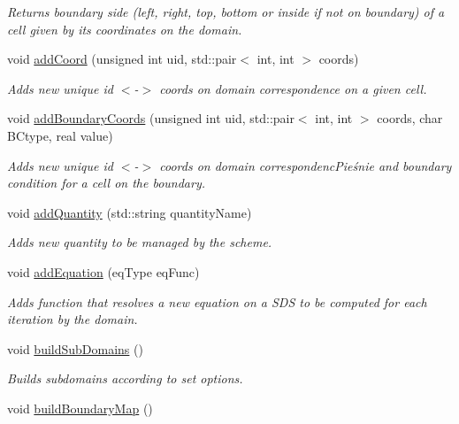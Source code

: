 \begin{DoxyCompactItemize}
\begin{DoxyCompactList}\small\item\em Returns boundary side (left, right, top, bottom or inside if not on boundary) of a cell given by its coordinates on the domain. \item\end{DoxyCompactList}\item 
void \hyperlink{classDomain_a1463e043dbcda6e6755dda83c26d6b73}{addCoord} (unsigned int uid, std::pair$<$ int, int $>$ coords)
\begin{DoxyCompactList}\small\item\em Adds new unique id $<$-\/$>$ coords on domain correspondence on a given cell. \item\end{DoxyCompactList}\item 
void \hyperlink{classDomain_a139f4270151467a3380922e98c644f79}{addBoundaryCoords} (unsigned int uid, std::pair$<$ int, int $>$ coords, char BCtype, real value)
\begin{DoxyCompactList}\small\item\em Adds new unique id $<$-\/$>$ coords on domain correspondencPieśnie and boundary condition for a cell on the boundary. \item\end{DoxyCompactList}\item 
void \hyperlink{classDomain_a9c33ac08523c95967ad2a51c59fd8d96}{addQuantity} (std::string quantityName)
\begin{DoxyCompactList}\small\item\em Adds new quantity to be managed by the scheme. \item\end{DoxyCompactList}\item 
void \hyperlink{classDomain_ab24a61d835dbebec7ff689ec8c7f2a95}{addEquation} (eqType eqFunc)
\begin{DoxyCompactList}\small\item\em Adds function that resolves a new equation on a SDS to be computed for each iteration by the domain. \item\end{DoxyCompactList}\item 
void \hyperlink{classDomain_a29537b651bacd922cae449357969d900}{buildSubDomains} ()
\begin{DoxyCompactList}\small\item\em Builds subdomains according to set options. \item\end{DoxyCompactList}\item 
\hypertarget{classDomain_a4d1ecd27481f6c7c0b077225fa48bc99}{
void \hyperlink{classDomain_a4d1ecd27481f6c7c0b077225fa48bc99}{buildBoundaryMap} ()}
\label{classDomain_a4d1ecd27481f6c7c0b077225fa48bc99}


\end{DoxyCompactItemize}
